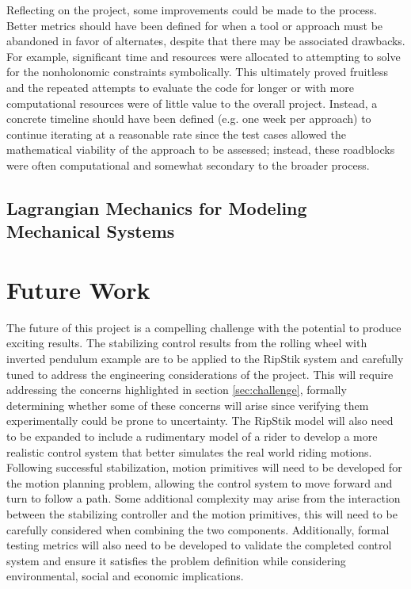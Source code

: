 Reflecting on the project, some improvements could be made to the process. 
Better metrics should have been defined for when a tool or approach must be abandoned in favor of alternates, despite that there may be associated drawbacks. 
For example, significant time and resources were allocated to attempting to solve for the nonholonomic constraints symbolically. 
This ultimately proved fruitless and the repeated attempts to evaluate the code for longer or with more computational resources were of little value to the overall project. 
Instead, a concrete timeline should have been defined (e.g. one week per approach) to continue iterating at a reasonable rate since the test cases allowed the mathematical viability of the approach to be assessed; instead, these roadblocks were often computational and somewhat secondary to the broader process.
\subsection{Lagrangian Mechanics for Modeling Mechanical Systems}


\section{Future Work}
The future of this project is a compelling challenge with the potential to produce exciting results. 
The stabilizing control results from the rolling wheel with inverted pendulum example are to be applied to the RipStik system and carefully tuned to address the engineering considerations of the project.
This will require addressing the concerns highlighted in section \ref{sec:challenge}, formally determining whether some of these concerns will arise since verifying them experimentally could be prone to uncertainty.
The RipStik model will also need to be expanded to include a rudimentary model of a rider to develop a more realistic control system that better simulates the real world riding motions.
Following successful stabilization, motion primitives will need to be developed for the motion planning problem, allowing the control system to move forward and turn to follow a path.
Some additional complexity may arise from the interaction between the stabilizing controller and the motion primitives, this will need to be carefully considered when combining the two components.
Additionally, formal testing metrics will also need to be developed to validate the completed control system and ensure it satisfies the problem definition while considering environmental, social and economic implications.